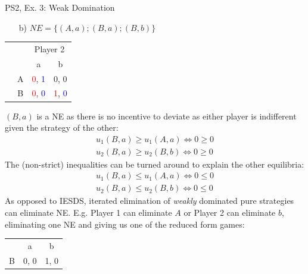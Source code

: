 \begin{frame}{PS2, Ex. 3: Weak Domination}
  \begin{multicols}{2}
    \begin{itemize}
      \item[b)] $NE=\{(A,a);(B,a);(B,b)\}$
    \end{itemize}
    \begin{table}
      \begin{tabular}{cc|c|c|}
        & \multicolumn{1}{c}{} & \multicolumn{2}{c}{\color{blue}Player 2}\\
        \parbox[t]{1mm}{}
        &  &   &  \\
        & A & \textcolor{red}{0}, \textcolor{blue}{1} & 0, 0 \\
        & B & \textcolor{red}{0}, \textcolor{blue}{0} & \textcolor{red}{1}, \textcolor{blue}{0} \\
      \end{tabular}
    \end{table}
    $(B,a)$ is a NE as there is no incentive to deviate as either player is indifferent given the strategy of the other:
    \begin{align*}
        u_1(B,a)\geq u_1(A,a)\Leftrightarrow0\geq0\\
        u_2(B,a)\geq u_2(B,b)\Leftrightarrow0\geq0
    \end{align*}
    The (non-strict) inequalities can be turned around to explain the other equilibria:
    \begin{align*}
        u_1(B,a)\leq u_1(A,a)\Leftrightarrow0\leq0\\
        u_2(B,a)\leq u_2(B,b)\Leftrightarrow0\leq0
    \end{align*}
    \vfill\null \columnbreak
    As opposed to IESDS, iterated elimination of \textit{weakly} dominated pure strategies can eliminate NE. E.g. Player 1 can eliminate $A$ or Player 2 can eliminate $b$, eliminating one NE and giving us one of the reduced form games:
    \begin{table}
      \begin{subtable}{.5\columnwidth}
        \begin{tabular}{c|c|c|}
            \multicolumn{1}{c}{} & \multicolumn{1}{c}{a}  & \multicolumn{1}{c}{b} \\\cline{2-3}
            B & 0, 0 & 1, 0 \\\cline{2-3}

\end{tabular}
\end{subtable}
\end{table}
\end{multicols}
\end{frame}
